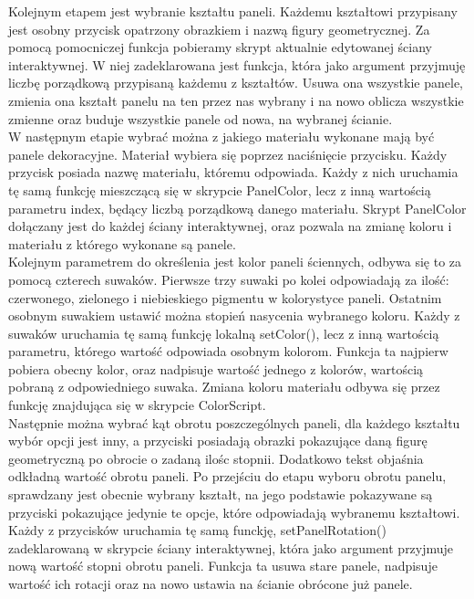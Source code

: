 \documentclass{article} %
\begin{document}
            Kolejnym etapem jest wybranie kształtu paneli. Każdemu kształtowi przypisany jest osobny przycisk opatrzony obrazkiem i nazwą figury geometrycznej. Za pomocą pomocniczej funkcja pobieramy skrypt aktualnie edytowanej ściany interaktywnej. W niej zadeklarowana jest funkcja, która jako argument przyjmuję liczbę porządkową przypisaną każdemu z kształtów. Usuwa ona wszystkie panele, zmienia ona kształt panelu na ten przez nas wybrany i na nowo oblicza wszystkie zmienne oraz buduje wszystkie panele od nowa, na wybranej ścianie.
            \\
            
            W następnym etapie wybrać można z jakiego materiału wykonane mają być panele dekoracyjne. Materiał wybiera się poprzez naciśnięcie przycisku. Każdy przycisk posiada nazwę materiału, któremu odpowiada. Każdy z nich uruchamia tę samą funkcję mieszczącą się w skrypcie PanelColor, lecz z inną wartością parametru index, będący liczbą porządkową danego materiału. Skrypt PanelColor dołączany jest do każdej ściany interaktywnej, oraz pozwala na zmianę koloru i materiału z którego wykonane są panele.
            \\
            
            Kolejnym parametrem do określenia jest kolor paneli ściennych, odbywa się to za pomocą czterech suwaków. Pierwsze trzy suwaki po kolei odpowiadają za ilość: czerwonego, zielonego i niebieskiego pigmentu w kolorystyce paneli. Ostatnim osobnym suwakiem ustawić można stopień nasycenia wybranego koloru. Każdy z suwaków uruchamia tę samą funkcję lokalną setColor(), lecz z inną wartością parametru, którego wartość odpowiada osobnym kolorom. Funkcja ta najpierw pobiera obecny kolor, oraz nadpisuje wartość jednego z kolorów, wartością pobraną z odpowiedniego suwaka. Zmiana koloru materiału odbywa się przez funkcję znajdująca się w skrypcie ColorScript.
            \\
            
            Następnie można wybrać kąt obrotu poszczególnych paneli, dla każdego kształtu wybór opcji jest inny, a przyciski posiadają obrazki pokazujące daną figurę geometryczną po obrocie o zadaną ilośc stopnii. Dodatkowo tekst objaśnia odkładną wartość obrotu paneli. Po przejściu do etapu wyboru obrotu panelu, sprawdzany jest obecnie wybrany kształt, na jego podstawie pokazywane są przyciski pokazujące jedynie te opcje, które odpowiadają wybranemu kształtowi. Każdy z przycisków uruchamia tę samą funckję, setPanelRotation() zadeklarowaną w skrypcie ściany interaktywnej, która jako argument przyjmuje nową wartość stopni obrotu paneli. Funkcja ta usuwa stare panele, nadpisuje wartość ich rotacji oraz na nowo ustawia na ścianie obrócone już panele.
            \\
            
\end{document}
